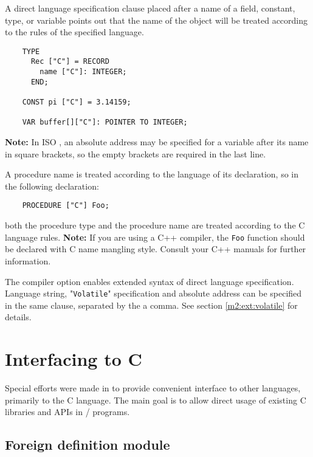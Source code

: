 A direct language specification clause placed after a name of a field,
constant, type, or variable points out that the name of the object
will be treated according to the rules of the specified
language.
\begin{verbatim}
    TYPE
      Rec ["C"] = RECORD
        name ["C"]: INTEGER;
      END;

    CONST pi ["C"] = 3.14159;

    VAR buffer[]["C"]: POINTER TO INTEGER;
\end{verbatim}
{\bf Note:} In ISO \mt{}, an absolute address may be specified
for a variable after its name in square brackets, so
the empty brackets are required in the last line.

A procedure name is treated according to the language of
its declaration, so in the following declaration:

\verb'    PROCEDURE ["C"] Foo;'

both the procedure type and the procedure name are treated
according to the C language rules.
{\bf Note:} If you are using a C++ compiler, the {\tt Foo}
function should be declared with C name mangling style.
Consult your C++ manuals for further information.
                                                         
The compiler option  enables extended syntax 
of direct language specification.  Language string, "{\tt Volatile}" 
specification and absolute address can be specified in the same clause, 
separated by the a comma.  See section \ref{m2:ext:volatile} for details. 



\section{Interfacing to C}\label{multilang:C}

Special efforts were made in \XDS{} to provide convenient
interface to other languages, primarily to the C language.
The main goal is to allow direct usage of existing C libraries and
APIs in \mt{}/\ot{} programs.


\subsection{Foreign definition module}
\label{multilang:foreigndefmod}

